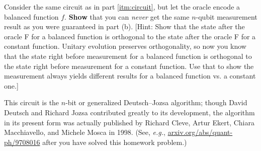 \documentclass{../phys084}
\begin{document}
\begin{exercise}
\begin{problems}
\begin{center}
    \end{center}


  \item Consider the same circuit as in part \ref{itm:circuit}, but
    let the oracle encode a balanced function \(f\).  \textbf{Show}
    that you can \textit{never} get the same \(n\)-qubit measurement
    result as you were guaranteed in part (b).  [Hint: Show that the
    state after the oracle F for a balanced function is orthogonal to
    the state after the oracle F for a constant function.  Unitary
    evolution preserves orthogonality, so now you know that the state
    right before measurement for a balanced function is orthogonal to
    the state right before measurement for a constant function.  Use
    that to show the measurement always yields different results for a
    balanced function vs. a constant one.]

    This circuit is the \(n\)-bit or generalized Deutsch--Jozsa
    algorithm; though David Deutsch and Richard Jozsa contributed
    greatly to its development, the algorithm in its present form was
    actually published by Richard Cleve, Artur Ekert, Chiara
    Macchiavello, and Michele Mosca in 1998. (See, \textit{e.g.},
    \url{arxiv.org/abs/quant-ph/9708016} after you have solved this
    homework problem.)
  \end{problems}
\end{exercise}

\begin{solution}
  \begin{problems}
  \item
  \item
  \item
  \end{problems}
\end{solution}
\end{document}
